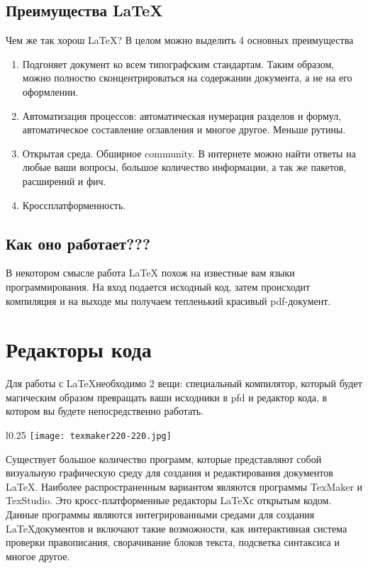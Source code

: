     \subsection{Преимущества \LaTeX}

    Чем же так хорош \LaTeX? В целом можно выделить 4 основных преимущества

    \begin{enumerate}
        \item Подгоняет документ ко всем типографским стандартам. Таким образом, можно полностю сконцентрироваться на содержании документа, а не на его оформлении.
        \item Автоматизация процессов: автоматическая нумерация разделов и формул, автоматическое составление оглавления и многое другое. Меньше рутины.
        \item Открытая среда. Обширное community. В интернете можно найти ответы на любые ваши вопросы, большое количество информации, а так же пакетов, расширений и фич.
        \item Кроссплатформенность.
    \end{enumerate}

    \subsection{Как оно работает???}

    В некотором смысле работа LaTeX похож на известные вам языки программирования. На вход подается исходный код, затем происходит компиляция и на выходе мы получаем тепленький красивый pdf-документ.


    \section{Редакторы кода}

    Для работы с \LaTeX необходимо 2 вещи: специальный компилятор, который будет магическим образом превращать ваши исходники в pfd и редактор кода, в котором вы будете непосредственно работать.
    
    \begin{wrapfigure}{l}{0.25\textwidth}
        \centering
        \texttt{[image: texmaker220-220.jpg]}
        \caption{}
    \end{wrapfigure}

    Существует большое количество программ, которые представляют собой визуальную графическую среду для создания и редактирования документов \LaTeX.
    Наиболее распространенным вариантом являются программы TexMaker и TexStudio. Это кросс-платформенные редакторы \LaTeX с открытым кодом. Данные программы являются интегрированными средами для создания \LaTeX документов и включают такие возможности, как интерактивная система проверки правописания, сворачивание блоков текста, подсветка синтаксиса и многое другое.

